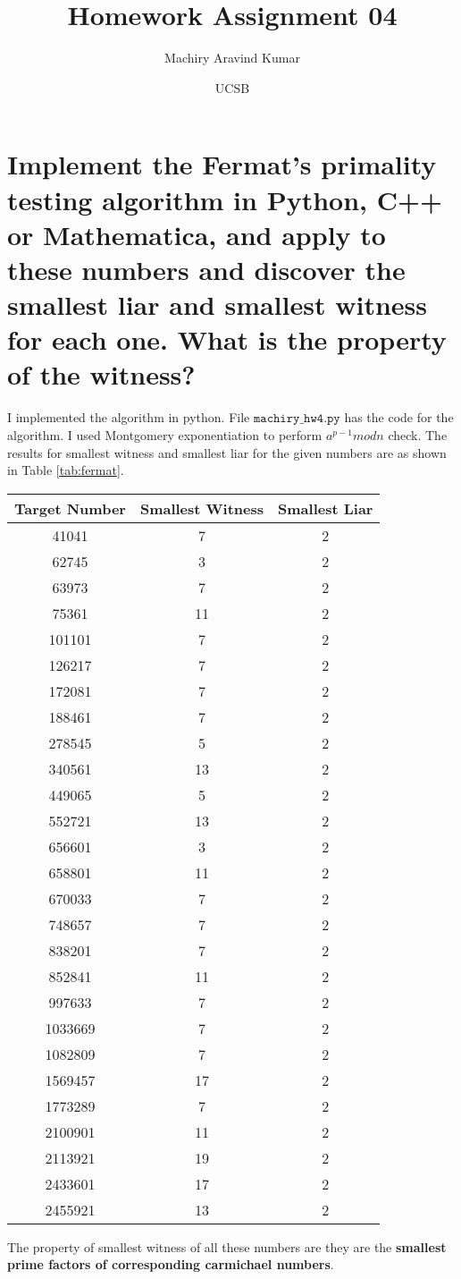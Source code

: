 \documentclass[11pt, pdftex]{article}
\title{Homework Assignment 04}
\author{Machiry Aravind Kumar}
\date{UCSB}
\begin{document}
\maketitle
\section{ Implement the Fermat’s primality testing algorithm in Python, C++ or Mathematica, and apply to these numbers and discover the smallest liar and smallest witness for each one. What is the property of the witness?}
I implemented the algorithm in python. File $\texttt{machiry\_hw4.py}$ has the code for the algorithm. I used Montgomery exponentiation to perform $a^{p-1} mod n$ check. The results for smallest witness and smallest liar for the given numbers are as shown in Table \ref{tab:fermat}.
\begin{center}
\begin{tabular}{ |c|c|c| }
\hline
Target Number & Smallest Witness & Smallest Liar\\
\hline
41041 & 7 & 2\\
\hline
62745 & 3 & 2\\
\hline
63973 & 7 & 2\\
\hline
75361 & 11 & 2\\
\hline
101101 & 7 & 2\\
\hline
126217 & 7 & 2\\
\hline
172081 & 7 & 2\\
\hline
188461 & 7 & 2\\
\hline
278545 & 5 & 2\\
\hline
340561 & 13 & 2\\
\hline
449065 & 5 & 2\\
\hline
552721 & 13 & 2\\
\hline
656601 & 3 & 2\\
\hline
658801 & 11 & 2\\
\hline
670033 & 7 & 2\\
\hline
748657 & 7 & 2\\
\hline
838201 & 7 & 2\\
\hline
852841 & 11 & 2\\
\hline
997633 & 7 & 2\\
\hline
1033669 & 7 & 2\\
\hline
1082809 & 7 & 2\\
\hline
1569457 & 17 & 2\\
\hline
1773289 & 7 & 2\\
\hline
2100901 & 11 & 2\\
\hline
2113921 & 19 & 2\\
\hline
2433601 & 17 & 2\\
\hline
2455921 & 13 & 2 \\
\hline
\end{tabular}
\label{tab:fermat}
\end{center}
The property of smallest witness of all these numbers are they are the \textbf{smallest prime factors of corresponding carmichael numbers}.
\end{document}
